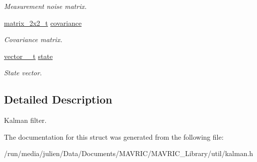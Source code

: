 \begin{DoxyCompactItemize}
\begin{DoxyCompactList}\small\item\em Measurement noise matrix. \end{DoxyCompactList}\item 
\hypertarget{structkalman__filter__2D__t_a76ac0388a71cf26531b4229ceeff38ef}{\hyperlink{structmatrix__2x2__t}{matrix\+\_\+2x2\+\_\+t} \hyperlink{structkalman__filter__2D__t_a76ac0388a71cf26531b4229ceeff38ef}{covariance}}\label{structkalman__filter__2D__t_a76ac0388a71cf26531b4229ceeff38ef}

\begin{DoxyCompactList}\small\item\em Covariance matrix. \end{DoxyCompactList}\item 
\hypertarget{structkalman__filter__2D__t_aec365fc26a46eead2edbe45151357f5a}{\hyperlink{structvector__2__t}{vector\+\_\+\_\+t} \hyperlink{structkalman__filter__2D__t_aec365fc26a46eead2edbe45151357f5a}{state}}\label{structkalman__filter__2D__t_aec365fc26a46eead2edbe45151357f5a}

\begin{DoxyCompactList}\small\item\em State vector. \end{DoxyCompactList}\end{DoxyCompactItemize}


\subsection{Detailed Description}
Kalman filter. 

The documentation for this struct was generated from the following file\+:\begin{DoxyCompactItemize}
\item 
/run/media/julien/\+Data/\+Documents/\+M\+A\+V\+R\+I\+C/\+M\+A\+V\+R\+I\+C\+\_\+\+Library/util/kalman.\+h\end{DoxyCompactItemize}
